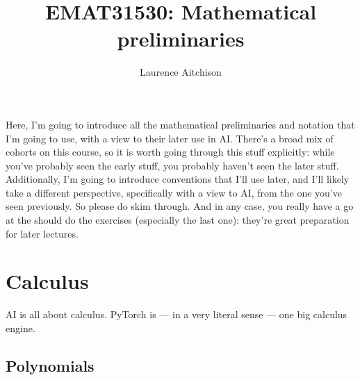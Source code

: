 \documentclass{article}
\title{EMAT31530: Mathematical preliminaries}
\author{Laurence Aitchison}
\date{}
\begin{document}
\maketitle

Here, I'm going to introduce all the mathematical preliminaries and notation that I'm going to use, with a view to their later use in AI.  There's a broad mix of cohorts on this course, so it is worth going through this stuff explicitly: while you've probably seen the early stuff, you probably haven't seen the later stuff.  Additionally, I'm going to introduce conventions that I'll use later, and I'll likely take a different perspective, specifically with a view to AI, from the one you've seen previously.  So please do skim through.  And in any case, you really have a go at the should do the exercises (especially the last one): they're great preparation for later lectures.

\section{Calculus}

AI is all about calculus.  PyTorch is --- in a very literal sense --- one big calculus engine.

\subsection{Polynomials}
\end{document}
